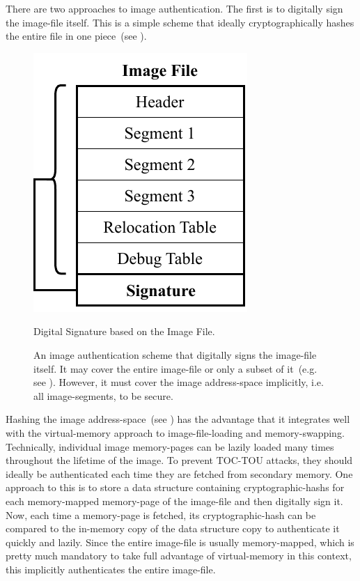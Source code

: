 There are two approaches to \gls{image} authentication. The first is to digitally sign the \gls{image-file} itself. This is a simple scheme that ideally cryptographically hashes the entire file in one piece~(see ).

\begin{figure}[htb]
  \centering
  \includegraphics{Figures/Signature.pdf}
  \caption{Digital Signature based on the Image File.}
  \label{fig:img_file_sig}
  \caption*{An \gls{image} authentication scheme that digitally signs the \gls{image-file} itself. It may cover the entire \gls{image-file} or only a subset of it~(e.g. see ). However, it must cover the \gls{image} \gls{address-space} implicitly, i.e. all \glspl{image-segment}, to be secure.}
\end{figure}

Hashing the \gls{image} \gls{address-space}~(see ) has the advantage that it integrates well with the \gls{virtual-memory} approach to \gls{image-file-loading} and \gls{memory-swapping}. Technically, individual \gls{image} \glspl{memory-page} can be lazily loaded many times throughout the lifetime of the \gls{image}. To prevent \gls{TOC-TOU} attacks, they should ideally be authenticated each time they are fetched from secondary memory. One approach to this is to store a data structure containing \glspl{cryptographic-hash} for each memory-mapped \gls{memory-page} of the \gls{image-file} and then digitally sign it. Now, each time a \gls{memory-page} is fetched, its \gls{cryptographic-hash} can be compared to the in-memory copy of the data structure copy to authenticate it quickly and lazily. Since the entire \gls{image-file} is usually memory-mapped, which is pretty much mandatory to take full advantage of \gls{virtual-memory} in this context, this implicitly authenticates the entire \gls{image-file}.

